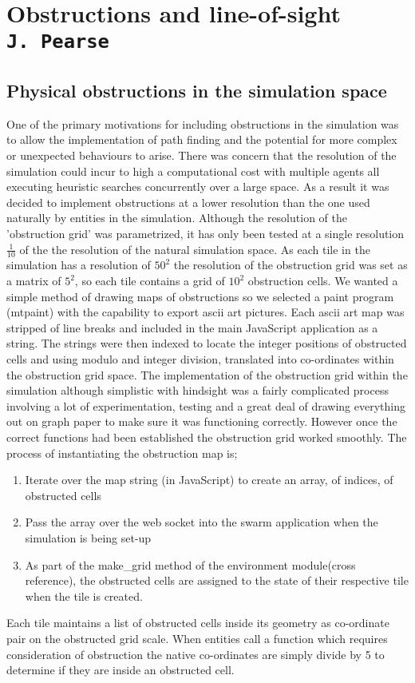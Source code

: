 \pagestyle{empty}

\section{Obstructions and line-of-sight\\{\small\tt{J.~Pearse}}}

\subsection{Physical obstructions in the simulation space}
One of the primary motivations for including obstructions in the simulation was to allow the implementation of path finding and the potential for more complex or unexpected behaviours to arise. There was concern that the resolution of the simulation could incur to high a computational cost with multiple agents all executing heuristic searches concurrently over a large space. As a result it was decided to implement obstructions at a lower resolution than the one used naturally by entities in the simulation. Although the resolution of the 'obstruction grid' was parametrized, it has only been tested at a single resolution \(\frac{1}{10}\) of the the resolution of the natural simulation space.
As each tile in the simulation has a resolution of \(50^2\) the resolution of the obstruction grid was set as a matrix of \(5^2\), so each tile contains a grid of \(10^2\) obstruction cells. We wanted a simple method of drawing maps of obstructions so we selected a paint program (mtpaint) with the capability to export ascii art pictures. Each ascii art map was stripped of line breaks and included in the main JavaScript application as a string. The strings were then indexed to locate the integer positions of obstructed cells and using modulo and integer division, translated into co-ordinates within the obstruction grid space. The implementation of the obstruction grid within the simulation although simplistic with hindsight was a fairly complicated process involving a lot of experimentation, testing and a great deal of drawing everything out on graph paper to make sure it was functioning correctly. However once the correct functions had been established the obstruction grid worked smoothly.
The process of instantiating the obstruction map is;
\begin{enumerate}
\item{Iterate over the map string (in JavaScript) to create an array, of indices, of obstructed cells}
\item{Pass the array over the web socket into the swarm application when the simulation is being set-up}
\item{As part of the make\_grid method of the environment module(cross reference), the obstructed cells are assigned to the state of their respective tile when the tile is created.}
\end{enumerate}
Each tile maintains a list of obstructed cells inside its geometry as co-ordinate pair on the obstructed grid scale.
When entities call a function which requires consideration of obstruction the native co-ordinates are simply divide by 5 to determine if they are inside an obstructed cell.

